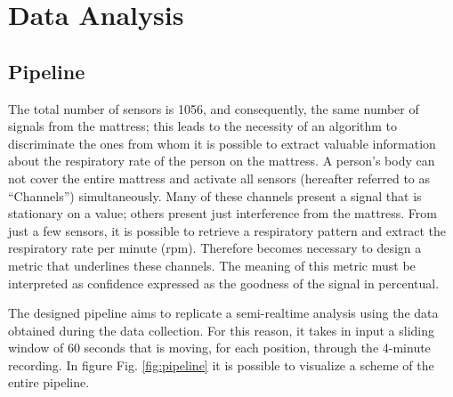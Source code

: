 \chapter{Data Analysis}
\section{Pipeline}
The total number of sensors is 1056, and consequently, the same number of signals from the mattress; this leads to the necessity of an algorithm to discriminate the ones from whom it is possible to extract valuable information about the respiratory rate of the person on the mattress. A person's body can not cover the entire mattress and activate all sensors (hereafter referred to as “Channels”) simultaneously.
Many of these channels present a signal that is stationary on a value; others present just interference from the mattress. From just a few sensors, it is possible to retrieve a respiratory pattern and extract the respiratory rate per minute (rpm). Therefore becomes necessary to design a metric that underlines these channels. The meaning of this metric must be interpreted as confidence expressed as the goodness of the signal in percentual.

The designed pipeline aims to replicate a semi-realtime analysis using the data obtained during the data collection. 
For this reason, it takes in input a sliding window of 60 seconds that is moving, for each position, through the 4-minute recording.
In figure Fig. \ref{fig:pipeline} it is possible to visualize a scheme of the entire pipeline.

